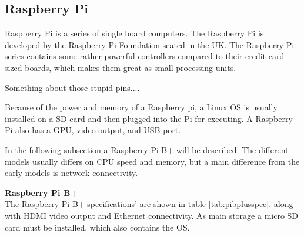 \subsection{Raspberry Pi}
Raspberry Pi is a series of single board computers. The Raspberry Pi is developed by the Raspberry Pi Foundation seated in the UK. The Raspberry Pi series contains some rather powerful controllers compared to their credit card sized boards, which makes them great as small processing units.

Something about those stupid pins....

Because of the power and memory of a Raspberry pi, a Linux OS is usually installed on a SD card and then plugged into the Pi for executing. A Raspberry Pi also has a GPU, video output, and USB port.

In the following subsection a Raspberry Pi B+ will be described. The different models usually differs on CPU speed and memory, but a main difference from the early models is network connectivity.

\textbf{Raspberry Pi B+}\\
The Raspberry Pi B+ specifications' are shown in table \ref{tab:pibplusspec}. along with HDMI video output and Ethernet connectivity. As main storage a micro SD card must be installed, which also contains the OS.



